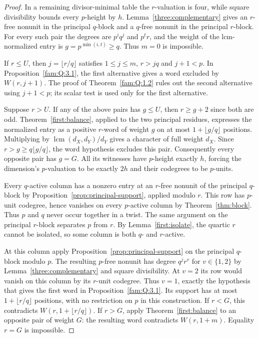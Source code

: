 \documentclass[11pt,a4paper]{article}
\numberwithin{equation}{section}
\theoremstyle{remark}
\begin{document}
\begin{proof}
In a remaining divisor-minimal table the $r$-valuation is four,
while square divisibility bounds every $p$-height by $h$. Lemma~\ref{three:complementary}
gives an $r$-free nonunit in the principal $q$-block and a $q$-free
nonunit in the principal $r$-block. For every such pair the degrees
are $p^i q^j$ and $p^t r$, and the weight of the lcm-normalized
entry is $g=p^{\min(i,t)}\ge q$. Thus $m=0$ is impossible.

If $r\le U$, then $j=\lfloor r/q\rfloor$ satisfies $1\le j\le m$,
$r>jq$ and $j+1<p$. In Proposition~\ref{fam:Q:3.1}, the first alternative gives
a word excluded by $W(r,j+1)$. The proof of Theorem~\ref{fam:Q:1.2} rules out
the second alternative using $j+1<p$; its scalar test is used only
for the first alternative.

Suppose $r>U$. If any of the above pairs has $g\le U$, then $r\ge g+2$
since both are odd. Theorem~\ref{first:balance}, applied to the two principal residues,
expresses the normalized entry as a positive $r$-word of weight $g$
on at most $1+\lfloor g/q\rfloor$ positions. Multiplying by
$\operatorname{lcm}(d_X,d_Y)/d_Y$ gives a character of full weight
$d_X$. Since $r>g\ge q\lfloor g/q\rfloor$, the word hypothesis excludes
this pair. Consequently every opposite pair has $g=G$. All its witnesses
have $p$-height exactly $h$, forcing the dimension's $p$-valuation to
be exactly $2h$ and their codegrees to be $p$-units.

Every $q$-active column has a nonzero entry at an $r$-free nonunit of the
principal $q$-block by Proposition~\ref{prop:principal-support}, applied modulo $r$. This row
has $p$-unit codegree, hence vanishes on every $p$-active column by Theorem~\ref{thm:block}. Thus $p$ and $q$ never occur together in a twist. The same
argument on the principal $r$-block separates $p$ from $r$. By Lemma~\ref{first:isolate}, the quartic $r$ cannot be isolated, so some column is both
$q$- and $r$-active.

At this column apply Proposition~\ref{prop:principal-support} on the principal $q$-block
modulo $p$. The resulting $p$-free nonunit has degree $q^j r^v$ for
$v\in\{1,2\}$ by Lemma~\ref{three:complementary} and square divisibility. At $v=2$
its row would vanish on this column by its $r$-unit codegree. Thus
$v=1$, exactly the hypothesis that gives the first word in Proposition~\ref{fam:Q:3.1}. Its support has at most $1+\lfloor r/q\rfloor$
positions, with no restriction on $p$ in this construction. If $r<G$,
this contradicts $W(r,1+\lfloor r/q\rfloor)$. If $r>G$, apply Theorem~\ref{first:balance} to an opposite pair of weight $G$: the resulting word
contradicts $W(r,1+m)$. Equality $r=G$ is impossible.
\end{proof}
\end{document}
